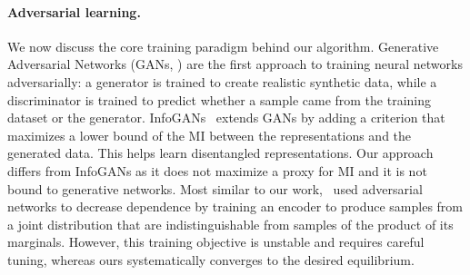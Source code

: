 \paragraph{Adversarial learning.} 
We now discuss the core training paradigm behind our algorithm. %
Generative Adversarial Networks (GANs, \cite{goodfellow2014generative}) are the first approach to training neural networks adversarially: a generator is trained to create realistic synthetic data, while a discriminator is trained to predict whether a sample came from the training dataset or the generator. 
InfoGANs~\cite{chen2016infogan} extends GANs by adding a criterion that maximizes a lower bound of the MI between the representations and the generated data. This helps learn disentangled representations. 
Our approach differs from InfoGANs as it does not maximize a proxy for MI and it is not bound to generative networks. 
Most similar to our work,~\cite{brakel2017indep_feats_adversarial} used adversarial networks to decrease dependence by training an encoder to produce samples from a joint distribution that are indistinguishable from samples of the product of its marginals. However, this training objective is unstable and requires careful tuning, whereas ours systematically converges to the desired equilibrium. 





